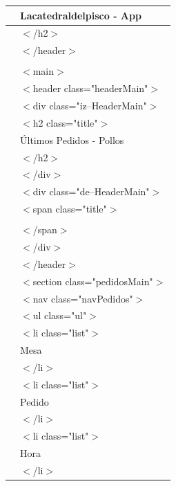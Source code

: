 \documentclass{article} %
\begin{document}
\begin{tabular}{|p{0.6in}|p{4.0in}|}
 &    Lacatedraldelpisco - App \\ \hline 
 &   $\mathrm{<}$/h2$\mathrm{>}$ \\ \hline 
 &  $\mathrm{<}$/header$\mathrm{>}$ \\ \hline 
 & \newline  \\ \hline 
 &  $\mathrm{<}$main$\mathrm{>}$ \\ \hline 
 &   $\mathrm{<}$header class="headerMain"$\mathrm{>}$ \\ \hline 
 &    $\mathrm{<}$div class="iz--HeaderMain"$\mathrm{>}$ \\ \hline 
 &     $\mathrm{<}$h2 class="title"$\mathrm{>}$ \\ \hline 
 &     \'{U}ltimos Pedidos - Pollos \\ \hline 
 &     $\mathrm{<}$/h2$\mathrm{>}$ \\ \hline 
 &    $\mathrm{<}$/div$\mathrm{>}$ \\ \hline 
 &    $\mathrm{<}$div class="de--HeaderMain"$\mathrm{>}$ \\ \hline 
 &     $\mathrm{<}$span class="title"$\mathrm{>}$ \\ \hline 
 &      \\ \hline 
 &     $\mathrm{<}$/span$\mathrm{>}$ \\ \hline 
 &    $\mathrm{<}$/div$\mathrm{>}$ \\ \hline 
 &   $\mathrm{<}$/header$\mathrm{>}$ \\ \hline 
 &   $\mathrm{<}$section class="pedidosMain"$\mathrm{>}$ \\ \hline 
 &    $\mathrm{<}$nav class="navPedidos"$\mathrm{>}$ \\ \hline 
 &     $\mathrm{<}$ul class="ul"$\mathrm{>}$ \\ \hline 
 &      $\mathrm{<}$li class="list"$\mathrm{>}$ \\ \hline 
 &       Mesa \\ \hline 
 &      $\mathrm{<}$/li$\mathrm{>}$ \\ \hline 
 &      $\mathrm{<}$li class="list"$\mathrm{>}$ \\ \hline 
 &       Pedido \\ \hline 
 &      $\mathrm{<}$/li$\mathrm{>}$ \\ \hline 
 &      $\mathrm{<}$li class="list"$\mathrm{>}$ \\ \hline 
 &       Hora \\ \hline 
 &      $\mathrm{<}$/li$\mathrm{>}$ \\ \hline 

\end{tabular}
\end{document}

